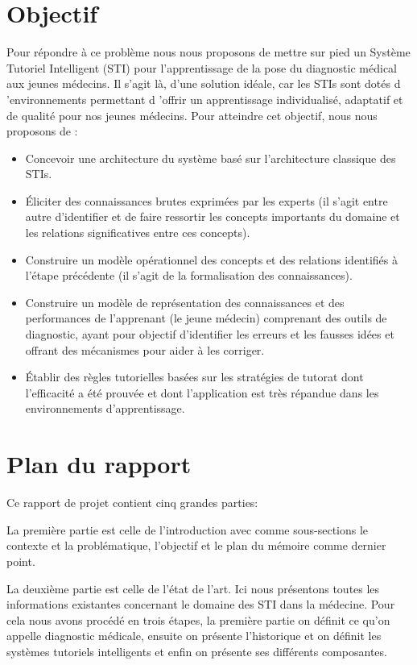 \section{Objectif}
Pour répondre à ce problème nous nous proposons de mettre sur pied un Système Tutoriel Intelligent (STI) pour l'apprentissage de la pose du diagnostic médical aux jeunes médecins. Il s'agit là, d'une solution idéale, car les STIs sont dotés d 'environnements permettant d 'offrir un apprentissage individualisé, adaptatif et de qualité pour nos jeunes médecins. Pour atteindre cet objectif, nous nous proposons de :
\begin{itemize}
    \item Concevoir une architecture du système basé sur l'architecture classique des STIs.
    \item Éliciter des connaissances brutes exprimées par les experts (il s'agit entre autre d'identifier et de faire ressortir les concepts importants du domaine et les relations significatives entre ces concepts).
    \item Construire un modèle opérationnel des concepts et des relations identifiés à l'étape précédente (il s'agit de la formalisation des connaissances).
    \item Construire un modèle de représentation des connaissances et des performances de l'apprenant (le jeune médecin) comprenant des outils de diagnostic, ayant pour objectif d'identifier les erreurs et les fausses idées et offrant des mécanismes pour aider à les corriger.
    \item Établir des règles tutorielles basées sur les stratégies de tutorat dont l'efficacité a été prouvée et dont l'application est très répandue dans les environnements d'apprentissage.
\end{itemize}



\section{Plan du rapport}
Ce rapport de projet contient cinq grandes parties:

La première partie est celle de l'introduction avec comme sous-sections le contexte et la problématique, l'objectif et le plan du mémoire comme dernier point.

La deuxième partie est celle de l'état de l'art. Ici nous présentons toutes les informations existantes concernant le domaine des STI dans la médecine. Pour cela nous avons procédé en trois étapes, la première partie on définit ce qu'on appelle diagnostic médicale, ensuite on présente l'historique et on définit les systèmes tutoriels intelligents et enfin on présente ses différents composantes.  

